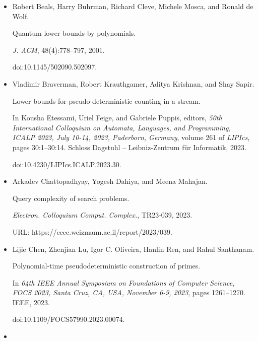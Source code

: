 \documentclass[10pt,a4paper]{article}
\begin{document}
\begin{itemize}
\item[] 
[5]

Robert Beals, Harry Buhrman, Richard Cleve, Michele Mosca, and Ronald de Wolf.


Quantum lower bounds by polynomials.


\emph{J. ACM}, 48(4):778–797, 2001.


doi:10.1145/502090.502097.





\item[] 
[6]

Vladimir Braverman, Robert Krauthgamer, Aditya Krishnan, and Shay Sapir.


Lower bounds for pseudo-deterministic counting in a stream.


In Kousha Etessami, Uriel Feige, and Gabriele Puppis, editors, \emph{50th International Colloquium on Automata, Languages, and Programming,
ICALP 2023, July 10-14, 2023, Paderborn, Germany}, volume 261 of \emph{LIPIcs}, pages 30:1–30:14. Schloss Dagstuhl – Leibniz-Zentrum für
Informatik, 2023.


doi:10.4230/LIPIcs.ICALP.2023.30.





\item[] 
[7]

Arkadev Chattopadhyay, Yogesh Dahiya, and Meena Mahajan.


Query complexity of search problems.


\emph{Electron. Colloquium Comput. Complex.}, TR23-039, 2023.


URL: https://eccc.weizmann.ac.il/report/2023/039.





\item[] 
[8]

Lijie Chen, Zhenjian Lu, Igor C. Oliveira, Hanlin Ren, and Rahul Santhanam.


Polynomial-time pseudodeterministic construction of primes.


In \emph{64th IEEE Annual Symposium on Foundations of Computer
Science, FOCS 2023, Santa Cruz, CA, USA, November 6-9, 2023}, pages
1261–1270. IEEE, 2023.


doi:10.1109/FOCS57990.2023.00074.





\item[] 
[9]


\end{itemize}
\end{document}
